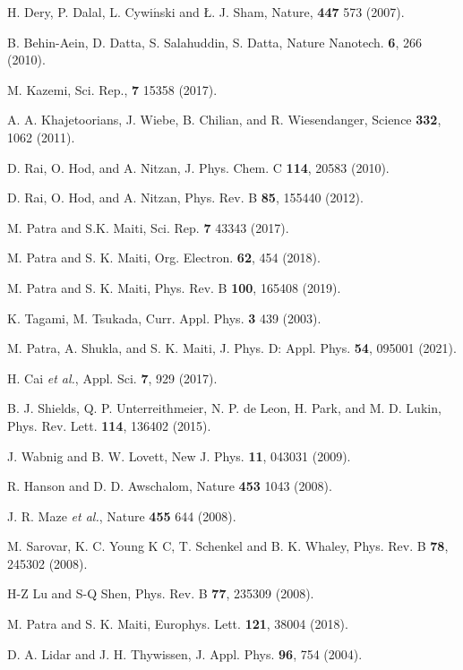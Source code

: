 \documentclass[prb,aps,twocolumn,amsmath,amssymb,floatfix,superscriptaddress]{revtex4}
\begin{document}
{\begin{thebibliography}{99}
 H. Dery, P. Dalal, L. Cywi$\acute{\mbox{n}}$ski and \L. J.
Sham, Nature, \textbf{447} 573 (2007).

 B. Behin-Aein, D. Datta, S. Salahuddin, S. Datta, Nature
Nanotech. \textbf{6}, 266 (2010).

 M. Kazemi, Sci. Rep., \textbf{7} 15358 (2017).

 A. A. Khajetoorians, J. Wiebe, B. Chilian, and R. Wiesendanger,
Science \textbf{332}, 1062 (2011).

 D. Rai, O. Hod, and A. Nitzan, J. Phys. Chem. C \textbf{114}, 20583 (2010).

 D. Rai, O. Hod, and  A. Nitzan, Phys. Rev. B \textbf{85}, 155440 (2012).

 M. Patra and  S.K. Maiti, Sci. Rep. \textbf{7} 43343 (2017).

 M. Patra and S. K. Maiti, Org. Electron. \textbf{62}, 454 (2018).

 M. Patra and S. K. Maiti, Phys. Rev. B \textbf{100}, 165408 (2019).

 K. Tagami, M. Tsukada, Curr. Appl. Phys. \textbf{3} 439 (2003).

 M. Patra, A. Shukla, and S. K. Maiti, J. Phys. D: Appl. Phys.
\textbf{54}, 095001 (2021).

 H. Cai {\it et al.}, Appl. Sci. \textbf{7}, 929 (2017).

 B. J. Shields, Q. P. Unterreithmeier, N. P. de Leon, H. Park, and
M. D. Lukin, Phys. Rev. Lett. \textbf{114}, 136402 (2015).

 J. Wabnig and B. W. Lovett, New J. Phys. \textbf{11}, 043031 (2009).

 R. Hanson and D. D. Awschalom, Nature \textbf{453} 1043 (2008).

 J. R. Maze {\it et al.}, Nature \textbf{455} 644 (2008).

 M. Sarovar, K. C. Young K C, T. Schenkel and B. K. Whaley,
 Phys. Rev. B \textbf{78}, 245302 (2008).

 H-Z Lu and S-Q Shen, Phys. Rev. B \textbf{77}, 235309 (2008).

 M. Patra and S. K. Maiti, Europhys. Lett. \textbf{121}, 38004 (2018).

 D. A. Lidar and J. H. Thywissen, J. Appl. Phys. \textbf{96},
754 (2004).


\end{thebibliography}}
\end{document}
